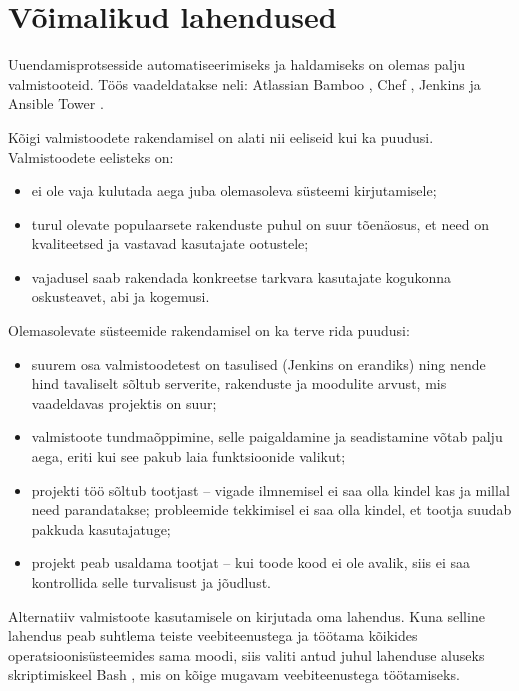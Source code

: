 \documentclass[12pt]{article}
\begin{document}
  \newpage
  
  \section{Võimalikud lahendused}
  
  Uuendamisprotsesside automatiseerimiseks ja haldamiseks on olemas palju valmistooteid. Töös vaadeldatakse neli: Atlassian Bamboo \cite{bamboo}, Chef \cite{chef}, Jenkins \cite{jenkins} ja Ansible Tower \cite{ansible}.
  
  Kõigi valmistoodete rakendamisel on alati nii eeliseid kui ka puudusi. Valmistoodete eelisteks on:
  \begin{itemize}
    \item ei ole vaja kulutada aega juba olemasoleva süsteemi kirjutamisele;
    \item turul olevate populaarsete rakenduste puhul on suur tõenäosus, et need on kvaliteetsed ja vastavad kasutajate ootustele;
    \item vajadusel saab rakendada konkreetse tarkvara kasutajate kogukonna oskusteavet, abi ja kogemusi.
  \end{itemize}
  
  Olemasolevate süsteemide rakendamisel on ka terve rida puudusi:
  \begin{itemize}
    \item suurem osa valmistoodetest on tasulised (Jenkins on erandiks) ning nende hind tavaliselt sõltub serverite, rakenduste ja moodulite arvust, mis vaadeldavas projektis on suur;
    \item valmistoote tundmaõppimine, selle paigaldamine ja seadistamine võtab palju aega, eriti kui see pakub laia funktsioonide valikut;
    \item projekti töö sõltub tootjast \--- vigade ilmnemisel ei saa olla kindel kas ja millal need parandatakse; probleemide tekkimisel ei saa olla kindel, et tootja suudab pakkuda kasutajatuge;
    \item projekt peab usaldama tootjat \--- kui toode kood ei ole avalik, siis ei saa kontrollida selle turvalisust ja jõudlust.
  \end{itemize}
    
  Alternatiiv valmistoote kasutamisele on kirjutada oma lahendus. Kuna selline lahendus peab suhtlema teiste veebiteenustega ja töötama kõikides operatsioonisüsteemides sama moodi, siis valiti antud juhul lahenduse aluseks skriptimiskeel Bash \cite{bash,bash-book}, mis on kõige mugavam veebiteenustega töötamiseks.
  
\end{document}
